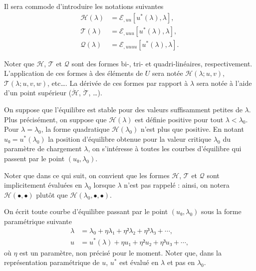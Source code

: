 \documentclass[12pt, final]{amsart}
\begin{document}
Il sera commode d'introduire les notations suivantes
\begin{align}
  ℋ(\lambda)&=ℰ_{,uu}[u^\ast(\lambda), \lambda],\\
  \mathcal T(\lambda)&=ℰ_{,uuu}[u^\ast(\lambda), \lambda],\\
  \mathcal Q(\lambda)&=ℰ_{,uuuu}[u^\ast(\lambda), \lambda].
\end{align}

Noter que \(ℋ\), \(\mathcal T\) et \(\mathcal Q\) sont des formes bi-,
tri- et quadri-linéaires, respectivement. L'application de ces formes à des
éléments de \(U\) sera notée \(ℋ(\lambda; u, v)\),
\(\mathcal T(\lambda; u, v, w)\), etc\dots. La dérivée de ces formes par
rapport à \(\lambda\) sera notée à l'aide d'un point supérieur
(\(\dot{ℋ}\), \(\dot{\mathcal T}\), \dots).

On suppose que l'équilibre est stable pour des valeurs suffisamment petites de
\(\lambda\). Plus précisément, on suppose que \(ℋ(\lambda)\) est
définie positive pour tout \(\lambda<\lambda_0\). Pour \(\lambda=\lambda_0\),
la forme quadratique \(ℋ(\lambda_0)\) n'est plus que positive. En
notant \(u₀=u^\ast(\lambda_0)\) la position d'équilibre obtenue pour la valeur
critique \(\lambda_0\) du paramètre de chargement \(\lambda\), on s'intéresse à
toutes les courbes d'équilibre qui passent par le point \((u₀, \lambda_0)\).

Noter que dans ce qui suit, on convient que les formes \(ℋ\),
\(\mathcal T\) et \(\mathcal Q\) sont implicitement évaluées en \(\lambda_0\)
lorsque \(\lambda\) n'est pas rappelé : ainsi, on notera
\(ℋ(•, •)\) plutôt que
\(ℋ(\lambda_0, •, •)\).

On écrit toute courbe d'équilibre passant par le point \((u₀, \lambda_0)\)
sous la forme paramétrique suivante
\begin{align}
  \label{eq:20211115075817}
  \lambda&=\lambda_0+η\lambda₁+η²\lambda₂+η³\lambda₃+\cdots,\\
  \label{eq:20211115075835}
  u&=u^\ast(\lambda)+η u₁+η² u₂+η³u₃+\cdots,
\end{align}
où \(η\) est un paramètre, non précisé pour le moment. Noter que, dans la
représentation paramétrique de \(u\), \(u^\ast\) est évalué en \(\lambda\) et
pas en \(\lambda_0\).
\end{document}
